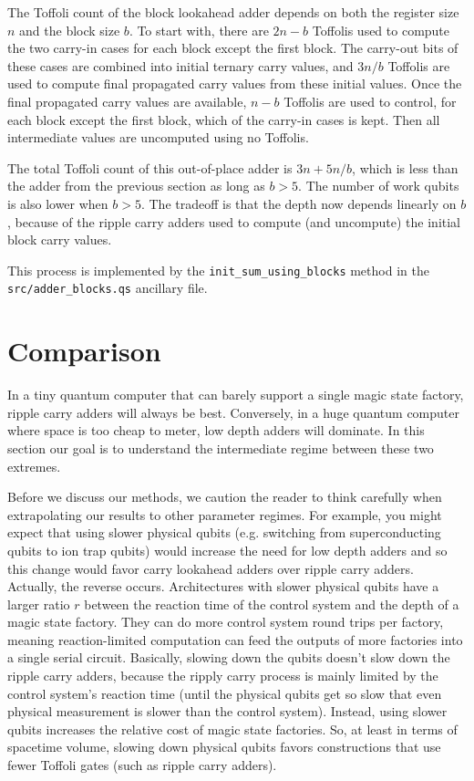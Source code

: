 \documentclass[onecolumn,unpublished]{quantumarticle}
\theoremstyle{definition}
\theoremstyle{definition}
\theoremstyle{definition}
\begin{document}
The Toffoli count of the block lookahead adder depends on both the register size $n$ and the block size $b$.
To start with, there are $2n-b$ Toffolis used to compute the two carry-in cases for each block except the first block.
The carry-out bits of these cases are combined into initial ternary carry values, and $3n/b$ Toffolis are used to compute final propagated carry values from these initial values.
Once the final propagated carry values are available, $n-b$ Toffolis are used to control, for each block except the first block, which of the carry-in cases is kept.
Then all intermediate values are uncomputed using no Toffolis.

The total Toffoli count of this out-of-place adder is $3n + 5n/b$, which is less than the adder from the previous section as long as $b > 5$.
The number of work qubits is also lower when $b > 5$.
The tradeoff is that the depth now depends linearly on $b$, because of the ripple carry adders used to compute (and uncompute) the initial block carry values.

This process is implemented by the \texttt{init\_sum\_using\_blocks} method in the \\\texttt{src/adder\_blocks.qs} ancillary file.


\section{Comparison}
\label{sec:estimate}

In a tiny quantum computer that can barely support a single magic state factory, ripple carry adders will always be best.
Conversely, in a huge quantum computer where space is too cheap to meter, low depth adders will dominate.
In this section our goal is to understand the intermediate regime between these two extremes.

Before we discuss our methods, we caution the reader to think carefully when extrapolating our results to other parameter regimes.
For example, you might expect that using slower physical qubits (e.g. switching from superconducting qubits to ion trap qubits) would increase the need for low depth adders and so this change would favor carry lookahead adders over ripple carry adders.
Actually, the reverse occurs.
Architectures with slower physical qubits have a larger ratio $r$ between the reaction time of the control system and the depth of a magic state factory.
They can do more control system round trips per factory, meaning reaction-limited computation can feed the outputs of more factories into a single serial circuit.
Basically, slowing down the qubits doesn't slow down the ripple carry adders, because the ripply carry process is mainly limited by the control system's reaction time (until the physical qubits get so slow that even physical measurement is slower than the control system).
Instead, using slower qubits increases the relative cost of magic state factories.
So, at least in terms of spacetime volume, slowing down physical qubits favors constructions that use fewer Toffoli gates (such as ripple carry adders).
\end{document}
